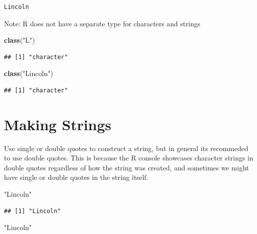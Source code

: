 \documentclass[
]{book}
\newenvironment{Shaded}{\begin{snugshade}}{\end{snugshade}}
\newcommand{\KeywordTok}[1]{\textcolor[rgb]{0.13,0.29,0.53}{\textbf{#1}}}
\newcommand{\NormalTok}[1]{#1}
\newcommand{\StringTok}[1]{\textcolor[rgb]{0.31,0.60,0.02}{#1}}
\begin{document}
\begin{verbatim}
Lincoln
\end{verbatim}

Note: R does not have a separate type for characters and strings

\begin{Shaded}
\begin{Highlighting}[]
\KeywordTok{class}\NormalTok{(}\StringTok{"L"}\NormalTok{)}
\end{Highlighting}
\end{Shaded}

\begin{verbatim}
## [1] "character"
\end{verbatim}

\begin{Shaded}
\begin{Highlighting}[]
\KeywordTok{class}\NormalTok{(}\StringTok{"Lincoln"}\NormalTok{)}
\end{Highlighting}
\end{Shaded}

\begin{verbatim}
## [1] "character"
\end{verbatim}

\hypertarget{making-strings}{%
\section{Making Strings}\label{making-strings}}

Use single or double quotes to construct a string, but in general its recommeded to use double quotes. This is because the R console showcases character strings in double quotes regardless of how the string was created, and sometimes we might have single or double quotes in the string itself.

\begin{Shaded}
\begin{Highlighting}[]
\StringTok{"Lincoln"}
\end{Highlighting}
\end{Shaded}

\begin{verbatim}
## [1] "Lincoln"
\end{verbatim}

\begin{Shaded}
\begin{Highlighting}[]
\StringTok{"Lincoln"}
\end{Highlighting}
\end{Shaded}
\end{document}
